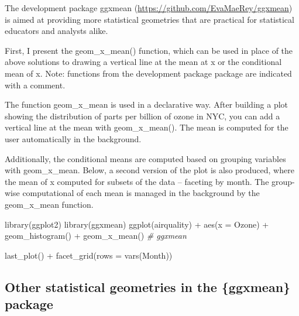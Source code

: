 \documentclass[12pt]{article}
\newenvironment{Shaded}{\begin{snugshade}}{\end{snugshade}}
\newcommand{\AttributeTok}[1]{\textcolor[rgb]{0.77,0.63,0.00}{#1}}
\newcommand{\CommentTok}[1]{\textcolor[rgb]{0.56,0.35,0.01}{\textit{#1}}}
\newcommand{\FunctionTok}[1]{\textcolor[rgb]{0.00,0.00,0.00}{#1}}
\newcommand{\NormalTok}[1]{#1}
\newcommand{\SpecialCharTok}[1]{\textcolor[rgb]{0.00,0.00,0.00}{#1}}
\begin{document}
The development package ggxmean
(\url{https://github.com/EvaMaeRey/ggxmean}) is aimed at providing more
statistical geometries that are practical for statistical educators and
analysts alike.

First, I present the geom\_x\_mean() function, which can be used in
place of the above solutions to drawing a vertical line at the mean at x
or the conditional mean of x. Note: functions from the development
package package are indicated with a comment.

The function geom\_x\_mean is used in a declarative way. After building
a plot showing the distribution of parts per billion of ozone in NYC,
you can add a vertical line at the mean with geom\_x\_mean(). The mean
is computed for the user automatically in the background.

Additionally, the conditional means are computed based on grouping
variables with geom\_x\_mean. Below, a second version of the plot is
also produced, where the mean of x computed for subsets of the data --
faceting by month. The group-wise computational of each mean is managed
in the background by the geom\_x\_mean function.

\begin{Shaded}
\begin{Highlighting}[]
\FunctionTok{library}\NormalTok{(ggplot2)}
\FunctionTok{library}\NormalTok{(ggxmean)}
\FunctionTok{ggplot}\NormalTok{(airquality) }\SpecialCharTok{+} 
  \FunctionTok{aes}\NormalTok{(}\AttributeTok{x =}\NormalTok{ Ozone) }\SpecialCharTok{+} 
  \FunctionTok{geom\_histogram}\NormalTok{() }\SpecialCharTok{+} 
  \FunctionTok{geom\_x\_mean}\NormalTok{() }\CommentTok{\# ggxmean}
\end{Highlighting}
\end{Shaded}

\begin{Shaded}
\begin{Highlighting}[]
\FunctionTok{last\_plot}\NormalTok{() }\SpecialCharTok{+} 
  \FunctionTok{facet\_grid}\NormalTok{(}\AttributeTok{rows =} \FunctionTok{vars}\NormalTok{(Month))}
\end{Highlighting}
\end{Shaded}

\hypertarget{other-statistical-geometries-in-the-ggxmean-package}{%
\subsection{Other statistical geometries in the \{ggxmean\}
package}\label{other-statistical-geometries-in-the-ggxmean-package}}
\end{document}
